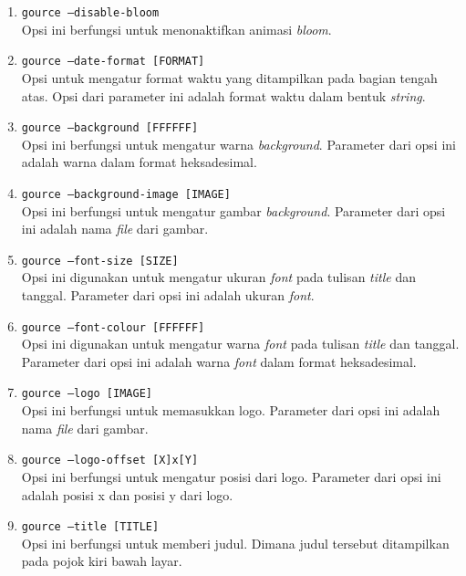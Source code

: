 \begin{enumerate}
\item \texttt{gource --disable-bloom}\\
Opsi ini berfungsi untuk menonaktifkan animasi \textit{bloom}.

\item \texttt{gource --date-format [FORMAT]}\\ 
Opsi untuk mengatur format waktu yang ditampilkan pada bagian tengah atas. Opsi dari parameter ini adalah format waktu dalam bentuk \textit{string}.

\item \texttt{gource --background [FFFFFF]}\\
Opsi ini berfungsi untuk mengatur warna \textit{background}. Parameter dari opsi ini adalah warna dalam format heksadesimal.

\item \texttt{gource --background-image [IMAGE]}\\
Opsi ini berfungsi untuk mengatur gambar \textit{background}. Parameter dari opsi ini adalah nama \textit{file} dari gambar.

\item \texttt{gource --font-size [SIZE]}\\
Opsi ini digunakan untuk mengatur ukuran \textit{font} pada tulisan \textit{title} dan tanggal. Parameter dari opsi ini adalah ukuran \textit{font}.  

\item \texttt{gource --font-colour [FFFFFF]}\\
Opsi ini digunakan untuk mengatur warna \textit{font} pada tulisan \textit{title} dan tanggal. Parameter dari opsi ini adalah warna \textit{font} dalam format heksadesimal.

\item \texttt{gource --logo [IMAGE]}\\
Opsi ini berfungsi untuk memasukkan logo. Parameter dari opsi ini adalah nama \textit{file} dari gambar.

\item \texttt{gource --logo-offset [X]x[Y]}\\
Opsi ini berfungsi untuk mengatur posisi dari logo. Parameter dari opsi ini adalah posisi x dan posisi y dari logo. 

\item \texttt{gource --title [TITLE]}\\
Opsi ini berfungsi untuk memberi judul. Dimana judul tersebut ditampilkan pada pojok kiri bawah layar. 


\end{enumerate}
